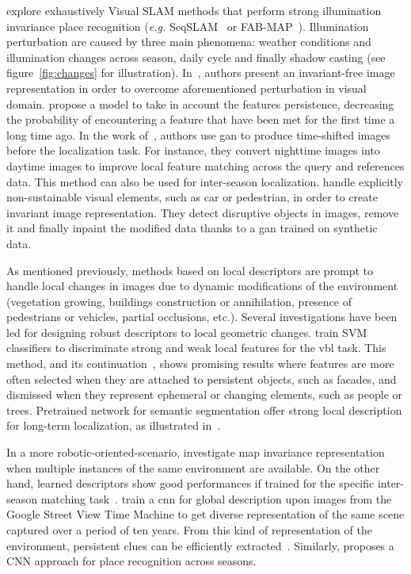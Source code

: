 			\citet[Section VII]{Lowry2016} explore exhaustively Visual SLAM methods that perform strong illumination invariance place recognition (\textit{e.g.} SeqSLAM~\citep{Milford2012,Pepperell2014,Pepperell2016} or FAB-MAP~\citep{Cummins2008,Cummins2010,Paul2010}). Illumination perturbation are caused by three main phenomena: weather conditions and illumination changes across season, daily cycle and finally shadow casting (see figure~\ref{fig:changes} for illustration). In~\citep{Lowry2016a}, authors present an invariant-free image representation in order to overcome aforementioned perturbation in visual domain. \citet{Rosen2016} propose a model to take in account the features persistence, decreasing the probability of encountering a feature that have been met for the first time a long time ago. In the work of~\citet{Porav2018}, authors use \ac{gan} to produce time-shifted images before the localization task. For instance, they convert nighttime images into daytime images to improve local feature matching across the query and references data. This method can also be used for inter-season localization. \citet{Bescos2019} handle explicitly non-sustainable visual elements, such as car or pedestrian, in order to create invariant image representation. They detect disruptive objects in images, remove it and finally inpaint the modified data thanks to a \ac{gan} trained on synthetic data.
			
			As mentioned previously, methods based on local descriptors are prompt to handle local changes in images due to dynamic modifications of the environment (\eg vegetation growing, buildings construction or annihilation, presence of pedestrians or vehicles, partial occlusions, etc.). Several investigations have been led for designing robust descriptors to local geometric changes. \citet{Kim2015} train SVM classifiers to discriminate strong and weak local features for the \ac{vbl} task. This method, and its continuation~\citep{Kim2017}, shows promising results where features are more often selected when they are attached to persistent objects, such as facades, and dismissed when they represent ephemeral or changing elements, such as people or trees. Pretrained network for semantic segmentation offer strong local description for long-term localization, as illustrated in~\citep{Mousavian2015,Garg2018a,Toft2018,Shi2019,Schonberger2017a}.
			
			In a more robotic-oriented-scenario, \citet{Muhlfellner2015} investigate map invariance representation when multiple instances of the same environment are available. On the other hand, learned descriptors show good performances if trained for the specific inter-season matching task~\citep{Carlevaris-Bianco2014}. \citet{Arandjelovic2017} train a \ac{cnn} for global description upon images from the Google Street View Time Machine to get diverse representation of the same scene captured over a period of ten years. From this kind of representation of the environment, persistent clues can be efficiently extracted~\citep{Neubert2015}. Similarly, \citet{kumar2017condition} proposes a CNN approach for place recognition across seasons.
			
